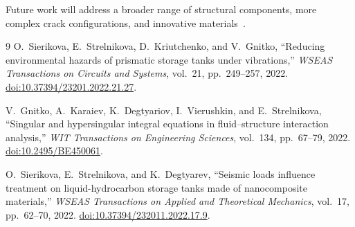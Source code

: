 Future work will address a broader range of structural components, more complex crack configurations, and innovative materials~\cite{kaplan:sierikova2022nano}.

\begin{thebibliography}{9}
O.~Sierikova, E.~Strelnikova, D.~Kriutchenko, and V.~Gnitko,
``Reducing environmental hazards of prismatic storage tanks under vibrations,''
\emph{WSEAS Transactions on Circuits and Systems}, vol.~21, pp.~249--257, 2022.
\href{https://doi.org/10.37394/23201.2022.21.27}{doi:10.37394/23201.2022.21.27}.

V.~Gnitko, A.~Karaiev, K.~Degtyariov, I.~Vierushkin, and E.~Strelnikova,
``Singular and hypersingular integral equations in fluid--structure interaction analysis,''
\emph{WIT Transactions on Engineering Sciences}, vol.~134, pp.~67--79, 2022.
\href{https://doi.org/10.2495/BE450061}{doi:10.2495/BE450061}.

O.~Sierikova, E.~Strelnikova, and K.~Degtyarev,
``Seismic loads influence treatment on liquid-hydrocarbon storage tanks made of nanocomposite materials,''
\emph{WSEAS Transactions on Applied and Theoretical Mechanics}, vol.~17, pp.~62--70, 2022.
\href{https://doi.org/10.37394/232011.2022.17.9}{doi:10.37394/232011.2022.17.9}.
\end{thebibliography}
